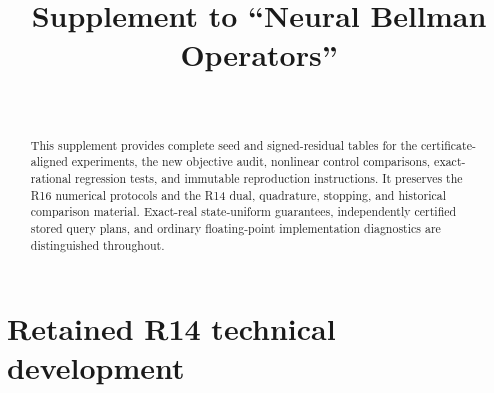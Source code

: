 \documentclass[ecta]{econsocart}
\theoremstyle{remark}
\begin{document}
\begin{frontmatter}
\title{Supplement to ``Neural Bellman Operators''}
\begin{aug}
\author[id=au1,addressref={add1}]{~}
\address[id=add1]{}
\end{aug}
\begin{abstract}
This supplement provides complete seed and signed-residual tables for the certificate-aligned experiments, the new objective audit, nonlinear control comparisons, exact-rational regression tests, and immutable reproduction instructions. It preserves the R16 numerical protocols and the R14 dual, quadrature, stopping, and historical comparison material. Exact-real state-uniform guarantees, independently certified stored query plans, and ordinary floating-point implementation diagnostics are distinguished throughout.
\end{abstract}
\end{frontmatter}


\section{Retained R14 technical development}

\clearpage

\end{document}
